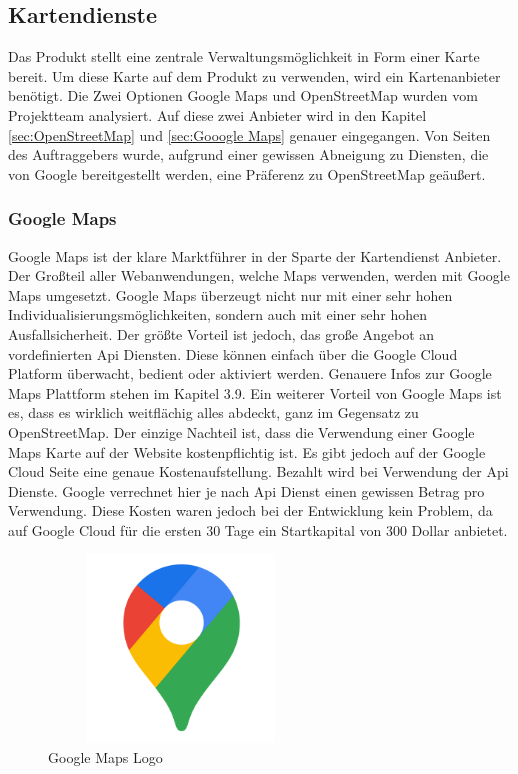 \subsection{Kartendienste}
Das Produkt stellt eine zentrale Verwaltungsmöglichkeit in Form einer Karte bereit. Um diese Karte auf dem Produkt zu verwenden, wird ein Kartenanbieter benötigt. Die Zwei Optionen Google Maps und OpenStreetMap wurden vom Projektteam analysiert. Auf diese zwei Anbieter wird in den Kapitel \ref{sec:OpenStreetMap} und \ref{sec:Gooogle Maps} genauer eingegangen. Von Seiten des Auftraggebers wurde, aufgrund einer gewissen Abneigung zu Diensten, die von Google bereitgestellt werden, eine Präferenz zu OpenStreetMap geäußert.

\subsubsection{Google Maps} \label{sec:Gooogle Map}


Google Maps ist der klare Marktführer in der Sparte der Kartendienst Anbieter.  Der Großteil  aller Webanwendungen, welche Maps verwenden, werden mit Google Maps umgesetzt. Google Maps überzeugt nicht nur mit einer sehr hohen Individualisierungsmöglichkeiten, sondern auch mit einer sehr hohen Ausfallsicherheit. Der größte Vorteil ist jedoch, das große Angebot an vordefinierten Api Diensten. Diese können einfach über die Google Cloud Platform überwacht, bedient oder aktiviert werden. Genauere Infos zur Google Maps Plattform stehen im Kapitel 3.9. Ein weiterer Vorteil von Google Maps ist es, dass es wirklich weitflächig alles abdeckt, ganz im Gegensatz zu OpenStreetMap. Der einzige Nachteil ist, dass die Verwendung einer Google Maps Karte auf der Website kostenpflichtig ist. Es gibt jedoch auf der Google Cloud Seite eine genaue Kostenaufstellung. Bezahlt wird bei Verwendung der Api Dienste. Google verrechnet hier je nach Api Dienst einen gewissen Betrag pro Verwendung. Diese Kosten waren jedoch bei der Entwicklung kein Problem, da auf Google Cloud für die ersten 30 Tage ein Startkapital von 300 Dollar anbietet.  
\begin{figure}[h]
	\centering
	\includegraphics[height=5cm,width=7cm]{images/GoogleMapsLogo}
	\caption{Google Maps Logo}
	\label{fig:GoogleMaps Logo}
\end{figure}
\newpage
